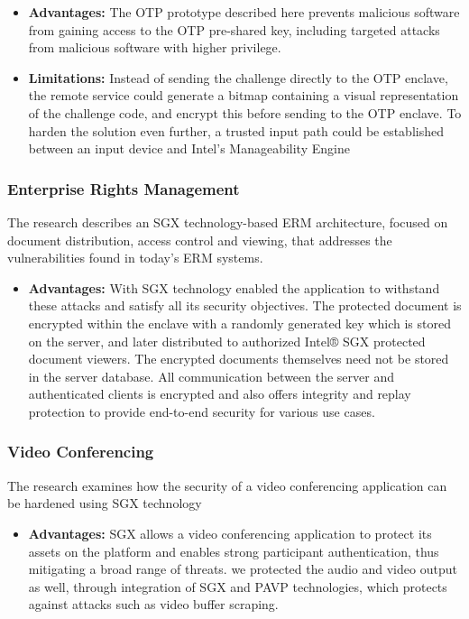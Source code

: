 \documentclass[conference]{IEEEtran}
\begin{document}
\begin{itemize}
    \item \textbf{Advantages:}  The OTP prototype described here prevents malicious software from gaining access to the OTP pre-shared key, including targeted attacks from malicious software with higher privilege.
    \item \textbf{Limitations:} Instead of sending the challenge directly to the OTP enclave, the remote service could generate a bitmap containing a visual representation of the challenge code, and encrypt this before sending to the OTP enclave. To harden the solution even further, a trusted input path could be established between an input device and Intel’s Manageability Engine
\end{itemize}
\subsubsection{Enterprise Rights Management}
\cite{trust5-7} The research describes an SGX technology-based ERM architecture, focused on document distribution, access control and viewing, that addresses the vulnerabilities found in today’s ERM systems.
\begin{itemize}
    \item \textbf{Advantages:}  With SGX technology enabled the application to withstand these attacks and satisfy all its security objectives. The protected document is encrypted within the enclave with a randomly generated key which is stored on the server, and later distributed to authorized Intel® SGX protected document viewers. The encrypted documents themselves need not be stored in the server database. All communication between the server and authenticated clients is encrypted and also offers integrity and replay protection to provide end-to-end security for various use cases.
\end{itemize}
\subsubsection{Video Conferencing}

\cite{trust5-7} The research examines how the security of a video conferencing application can be hardened using SGX technology
\begin{itemize}
    \item \textbf{Advantages:}  SGX allows a video conferencing application to protect its assets on the platform and enables strong participant authentication, thus mitigating a broad range of threats. we protected the audio and video output as  well, through integration of SGX and PAVP technologies, which protects against attacks such as video buffer scraping.
\end{itemize}
\end{document}
